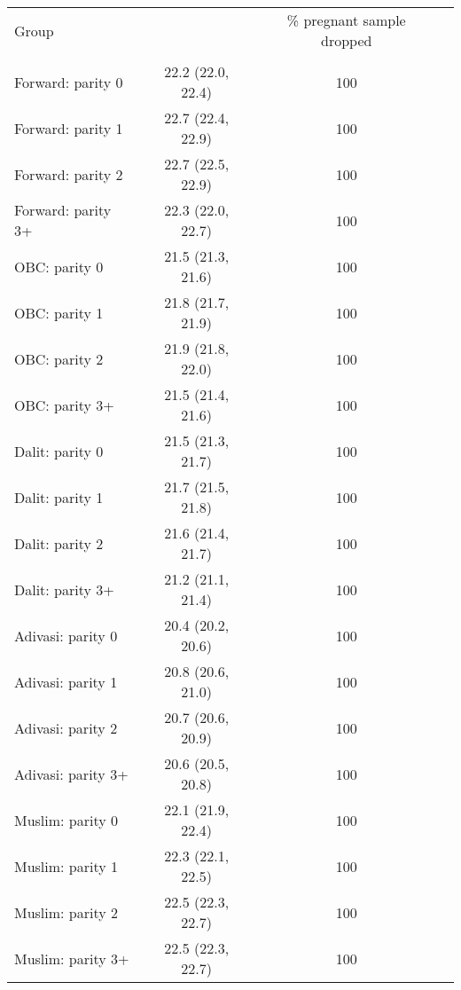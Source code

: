 \begin{tabular}{lccc}
\toprule
Group &  & \% pregnant sample dropped \\\\
\midrule
Forward: parity 0&22.2 (22.0, 22.4)&100\\
Forward: parity 1&22.7 (22.4, 22.9)&100\\
Forward: parity 2&22.7 (22.5, 22.9)&100\\
Forward: parity 3+&22.3 (22.0, 22.7)&100\\
OBC: parity 0&21.5 (21.3, 21.6)&100\\
OBC: parity 1&21.8 (21.7, 21.9)&100\\
OBC: parity 2&21.9 (21.8, 22.0)&100\\
OBC: parity 3+&21.5 (21.4, 21.6)&100\\
Dalit: parity 0&21.5 (21.3, 21.7)&100\\
Dalit: parity 1&21.7 (21.5, 21.8)&100\\
Dalit: parity 2&21.6 (21.4, 21.7)&100\\
Dalit: parity 3+&21.2 (21.1, 21.4)&100\\
Adivasi: parity 0&20.4 (20.2, 20.6)&100\\
Adivasi: parity 1&20.8 (20.6, 21.0)&100\\
Adivasi: parity 2&20.7 (20.6, 20.9)&100\\
Adivasi: parity 3+&20.6 (20.5, 20.8)&100\\
Muslim: parity 0&22.1 (21.9, 22.4)&100\\
Muslim: parity 1&22.3 (22.1, 22.5)&100\\
Muslim: parity 2&22.5 (22.3, 22.7)&100\\
Muslim: parity 3+&22.5 (22.3, 22.7)&100\\
\bottomrule
\end{tabular}
